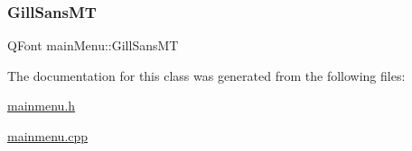 \subsubsection{\texorpdfstring{GillSansMT}{GillSansMT}}
{\footnotesize\ttfamily Q\+Font main\+Menu\+::\+Gill\+Sans\+MT}



The documentation for this class was generated from the following files\+:\begin{DoxyCompactItemize}
\item 
\mbox{\hyperlink{mainmenu_8h}{mainmenu.\+h}}\item 
\mbox{\hyperlink{mainmenu_8cpp}{mainmenu.\+cpp}}\end{DoxyCompactItemize}
